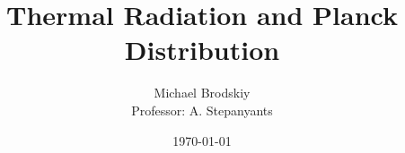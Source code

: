 


\title{Thermal Radiation and Planck Distribution}
\date{\today}
\author{Michael Brodskiy\\ \small Professor: A. Stepanyants}



\maketitle


